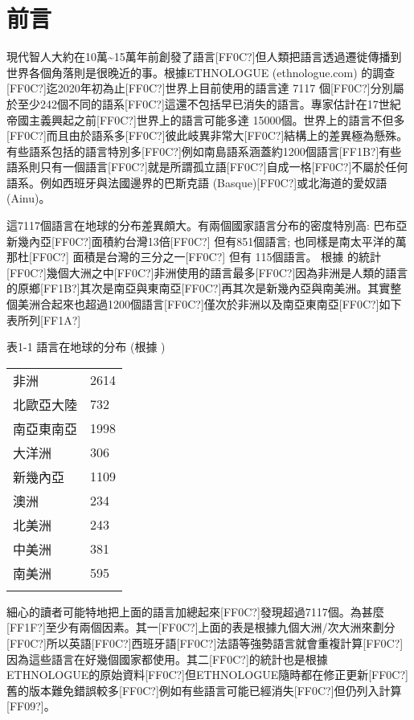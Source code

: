 \section{前言} 

現代智人大約在10萬{\textasciitilde}15萬年前創發了語言[FF0C?]但人類把語言透過遷徙傳播到世界各個角落則是很晚近的事。根據ETHNOLOGUE (ethnologue.com) 的調查[FF0C?]迄2020年初為止[FF0C?]世界上目前使用的語言達 7117 個[FF0C?]分別屬於至少242個不同的語系[FF0C?]這還不包括早已消失的語言。專家估計在17世紀帝國主義興起之前[FF0C?]世界上的語言可能多達 15000個。世界上的語言不但多[FF0C?]而且由於語系多[FF0C?]彼此岐異非常大[FF0C?]結構上的差異極為懸殊。有些語系包括的語言特別多[FF0C?]例如南島語系涵蓋約1200個語言[FF1B?]有些語系則只有一個語言[FF0C?]就是所謂孤立語[FF0C?]自成一格[FF0C?]不屬於任何語系。例如西班牙與法國邊界的巴斯克語 (Basque)[FF0C?]或北海道的愛奴語 (Ainu)。

這7117個語言在地球的分布差異頗大。有兩個國家語言分布的密度特別高: 巴布亞新幾內亞[FF0C?]面積約台灣13倍[FF0C?] 但有851個語言; 也同樣是南太平洋的萬那杜[FF0C?] 面積是台灣的三分之一[FF0C?] 但有 115個語言。 根據\citet{Nettle1999} 的統計[FF0C?]幾個大洲之中[FF0C?]非洲使用的語言最多[FF0C?]因為非洲是人類的語言的原鄉[FF1B?]其次是南亞與東南亞[FF0C?]再其次是新幾內亞與南美洲。其實整個美洲合起來也超過1200個語言[FF0C?]僅次於非洲以及南亞東南亞[FF0C?]如下表所列[FF1A?]                               

\begin{styleListParagraph}
表1-1  語言在地球的分布  (根據 \citet{Nettle1999})
\end{styleListParagraph}

\tablefirsthead{}

\tabletail{}
\tablelasttail{}
\begin{tabularx}{\textwidth}{XX}
\lsptoprule

非洲 & 2614\\
北歐亞大陸 & 732\\
南亞東南亞 & 1998\\
大洋洲 & 306\\
新幾內亞 & 1109\\
澳洲 & 234\\
北美洲 & 243\\
中美洲 & 381\\
南美洲 & 595\\
\lspbottomrule
\end{tabularx}
細心的讀者可能特地把上面的語言加總起來[FF0C?]發現超過7117個。為甚麼[FF1F?]至少有兩個因素。其一[FF0C?]上面的表是根據九個大洲/次大洲來劃分[FF0C?]所以英語[FF0C?]西班牙語[FF0C?]法語等強勢語言就會重複計算[FF0C?]因為這些語言在好幾個國家都使用。其二[FF0C?]\citet{Nettle1999}的統計也是根據 ETHNOLOGUE的原始資料[FF0C?]但ETHNOLOGUE隨時都在修正更新[FF0C?]舊的版本難免錯誤較多[FF0C?]例如有些語言可能已經消失[FF0C?]但仍列入計算[FF09?]。

